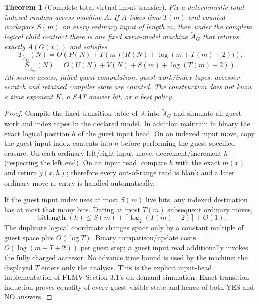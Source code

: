 \documentclass[11pt]{article}
\newtheorem{theorem}{Theorem}
\begin{document}
\begin{theorem}[Complete total virtual-input transfer]\label{th:total}
Fix a deterministic total indexed random-access machine $A$. If $A$ takes time $T(m)$ and counted workspace $S(m)$ on every ordinary input of length $m$, then under the complete logical child contract there is one fixed same-model machine $\widetilde A_G$ that returns exactly $A(G(x))$ and satisfies
\[
 T_{\widetilde A_G}(N)
 =O\!\left(P(N)+T(m)\bigl(R(N)+\log(m+T(m)+2)\bigr)\right),
\]
\[
 S_{\widetilde A_G}(N)
 =O\!\left(U(N)+V(N)+S(m)+\log(T(m)+2)\right).
\]
All source access, failed guest computation, guest work/index tapes, accessor scratch and retained compiler state are counted. The construction does not know a time exponent $K$, a SAT answer bit, or a best policy.
\end{theorem}

\begin{proof}
Compile the fixed transition table of $A$ into $\widetilde A_G$ and simulate all guest work and index tapes in the declared model. In addition maintain in binary the exact logical position $h$ of the guest input head. On an indexed input move, copy the guest input-index contents into $h$ before performing the guest-specified erasure. On each ordinary left/right input move, decrement/increment $h$ (respecting the left end). On an input read, compare $h$ with the exact $m(x)$ and return $\widehat g(x,h)$; therefore every out-of-range read is blank and a later ordinary-move re-entry is handled automatically.

If the guest input index uses at most $S(m)$ live bits, any indexed destination has at most that many bits. During at most $T(m)$ subsequent ordinary moves,
\[
 \operatorname{bitlength}(h)\le S(m)+\lceil\log_2(T(m)+2)\rceil+O(1).
\]
The duplicate logical coordinate changes space only by a constant multiple of guest space plus $O(\log T)$. Binary comparison/update costs $O(\log(m+T+2))$ per guest step; a guest input read additionally invokes the fully charged accessor. No advance time bound is used by the machine: the displayed $T$ enters only the analysis. This is the explicit input-head implementation of FLMV Section 3.1's on-demand simulation. Exact transition induction proves equality of every guest-visible state and hence of both YES and NO answers.\end{proof}
\end{document}

